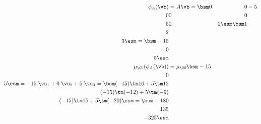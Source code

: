 \begin{solution}
\begin{itemize}
\begin{align*}
    \phi_A(\vb) &= A\vb = \bsm 0&0&-5\\ 0&0&0\\ 5&0&0\esm
                          \bsm 1\\ 2\\ 3\esm 
                 = \bsm -15\\ 0\\ 5 \esm \\
    \mu_\CU(\phi_A(\vb)) &= 
     \mu_\CU\bsm -15\\ 0\\ 5\esm =
      -15.\vu_1 + 0.\vu_2 + 5.\vu_3 =
      \bsm (-15)\tm 16 + 5\tm 12 \\
           (-15)\tm(-12) + 5\tm(-9) \\
           (-15)\tm 15 + 5\tm(-20) \esm = 
      \bsm -180 \\ 135 \\ -325 \esm
   \end{align*}
 \end{itemize}
\end{solution}


